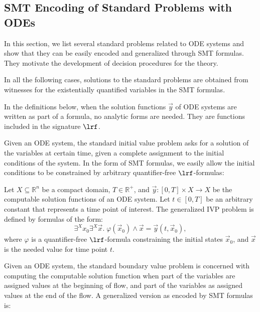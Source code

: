 \documentclass[11pt]{article}
\begin{document}
\subsection{SMT Encoding of Standard Problems with ODEs}
\label{encoding}
In this section, we list several standard problems related to ODE systems and show that they can be easily encoded and generalized through SMT formulas. They motivate the development of decision procedures for the theory. 
\begin{remark}
In all the following cases, solutions to the standard problems are obtained from witnesses for the existentially quantified variables in the SMT formulas.
\end{remark}
\begin{remark}
In the definitions below, when the solution functions $\vec y$ of ODE systems are written as part of a formula, no analytic forms are needed. They are functions included in the signature $\lrf$. 
\end{remark}
 Given an ODE system, the standard initial value problem asks for a solution of the variables at certain time, given a complete assignment to the initial conditions of the system. In the form of SMT formulas, we easily allow the initial conditions to be constrained by arbitrary quantifier-free $\lrf$-formulas:
\begin{definition}
Let $X\subseteq \mathbb{R}^n$ be a compact domain, $T\in \mathbb{R}^+$, and $\vec y: [0,T]\times X\rightarrow X$ be the computable solution functions of an ODE system.  Let $t\in [0,T]$ be an arbitrary constant that represents a time point of interest. The generalized IVP problem is defined by formulas of the form:
$$\exists^{X} x_0\exists^{X} \vec x.\; \varphi(\vec x_0)\wedge \vec x = \vec y(t,\vec x_0),$$
where $\varphi$ is a quantifier-free $\lrf$-formula constraining the initial states $\vec x_0$, and $\vec x$ is the needed value for time point $t$. 
\end{definition}
 Given an ODE system, the standard boundary value problem is concerned with computing the computable solution function when part of the variables are assigned values at the beginning of flow, and part of the variables as assigned values at the end of the flow. A generalized version as encoded by SMT formulas is:
\end{document}
